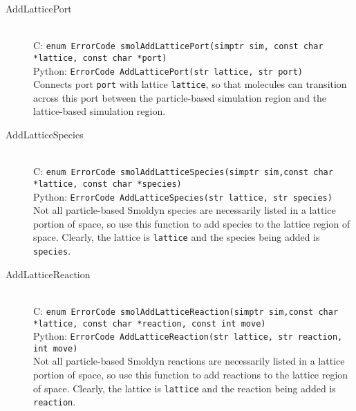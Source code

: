 \documentclass {book}
\newcommand {\ttt} {\texttt}
\begin{document}
\begin{description}
\item[AddLatticePort]
\hfill \\
C: \ttt{enum ErrorCode smolAddLatticePort(simptr sim, const char *lattice, const char *port)}\\
Python: \ttt{ErrorCode AddLatticePort(str lattice, str port)}\\
Connects port \ttt{port} with lattice \ttt{lattice}, so that molecules can transition across this port between the particle-based simulation region and the lattice-based simulation region.

\item[AddLatticeSpecies]
\hfill \\
C: \ttt{enum ErrorCode smolAddLatticeSpecies(simptr sim,const char *lattice, const char *species)}\\
Python: \ttt{ErrorCode AddLatticeSpecies(str lattice, str species)}\\
Not all particle-based Smoldyn species are necessarily listed in a lattice portion of space, so use this function to add species to the lattice region of space. Clearly, the lattice is \ttt{lattice} and the species being added is \ttt{species}.

\item[AddLatticeReaction]
\hfill \\
C: \ttt{enum ErrorCode smolAddLatticeReaction(simptr sim,const char *lattice, const char *reaction, const int move)}\\
Python: \ttt{ErrorCode AddLatticeReaction(str lattice, str reaction, int move)}\\
Not all particle-based Smoldyn reactions are necessarily listed in a lattice portion of space, so use this function to add reactions to the lattice region of space. Clearly, the lattice is \ttt{lattice} and the reaction being added is \ttt{reaction}.

\end{description}
\end{document}
